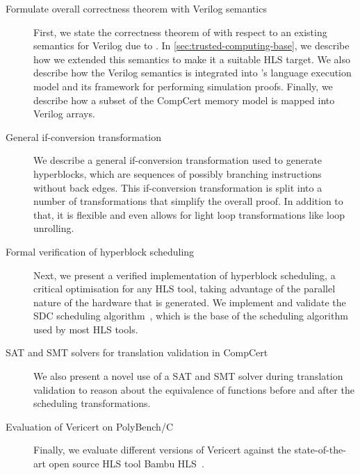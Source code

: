 \begin{description}
\item[Formulate overall correctness theorem with Verilog semantics] First, we
  state the correctness theorem of \vericert{} with respect to an existing
  semantics for Verilog due to \textcite{lööw19_proof_trans_veril_devel_hol}. In
  \cref{sec:trusted-computing-base}, we describe how we extended this semantics
  to make it a suitable \gls{HLS} target.  We also describe how the Verilog
  semantics is integrated into \compcert{}'s language execution model and its
  framework for performing simulation proofs.  Finally, we describe how a subset
  of the \gls{CompCert} memory model is mapped into Verilog arrays.

\item[General if-conversion transformation] We describe a general if-conversion
  transformation used to generate hyperblocks, which are sequences of possibly
  branching instructions without back edges.  This if-conversion transformation
  is split into a number of transformations that simplify the overall proof.  In
  addition to that, it is flexible and even allows for light loop
  transformations like loop unrolling.

\item[Formal verification of hyperblock scheduling] Next, we present a verified
  implementation of hyperblock scheduling, a critical optimisation for any
  \gls{HLS} tool, taking advantage of the parallel nature of the hardware that
  is generated.  We implement and validate the \gls{SDC} scheduling
  algorithm~\cite{cong06_sdc}, which is the base of the scheduling algorithm
  used by most \gls{HLS} tools.

\item[SAT and SMT solvers for translation validation in CompCert] We also
  present a novel use of a SAT and SMT solver during translation validation to
  reason about the equivalence of functions before and after the scheduling
  transformations.


\item[Evaluation of Vericert on PolyBench/C] Finally, we evaluate different
  versions of Vericert against the state-of-the-art open source \gls{HLS} tool
  Bambu HLS~\cite{pilato13_bambu}.
\end{description}

